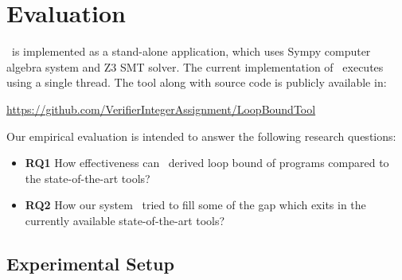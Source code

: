 \section{Evaluation}
\label{sec:evaluation}

\SystemName\ is implemented  as a stand-alone application, which uses Sympy \cite{joyner2012open} computer algebra system  and Z3 \cite{de2008z3} SMT solver.
The current implementation of \SystemName\ executes using a single thread. The tool along with source code is  publicly available  in:

\url{https://github.com/VerifierIntegerAssignment/LoopBoundTool}

Our empirical evaluation is intended to answer the following research questions:
\begin{itemize} 
	\item \textbf{RQ1} How effectiveness can \SystemName\ derived loop bound of programs compared to the state-of-the-art tools? 
	\item \textbf{RQ2} How our system \SystemName\ tried to fill some of the gap which exits in the currently available state-of-the-art tools?
\end{itemize}

\subsection{Experimental Setup}

